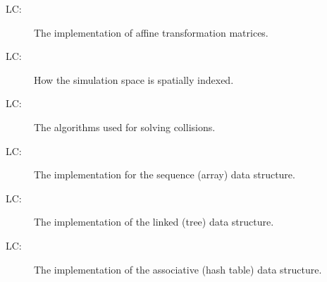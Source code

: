 \documentclass[12pt]{article}
\newcounter{lcnum}
\newcommand{\lcthelcnum}{LC\thelcnum}
\begin{document}
\begin{description}
\item[\lcthelcnum\label{LC:transform}:]The implementation of affine transformation matrices.
\end{description}
\begin{description}
\item[\lcthelcnum\label{LC:spatialindex}:]How the simulation space is spatially indexed.
\end{description}
\begin{description}
\item[\lcthelcnum\label{LC:collision}:]The algorithms used for solving collisions.
\end{description}
\begin{description}
\item[\lcthelcnum\label{LC:array}:]The implementation for the sequence (array) data structure.
\end{description}
\begin{description}
\item[\lcthelcnum\label{LC:tree}:]The implementation of the linked (tree) data structure.
\end{description}
\begin{description}
\item[\lcthelcnum\label{LC:hashtable}:]The implementation of the associative (hash table) data structure.
\end{description}
\end{document}
